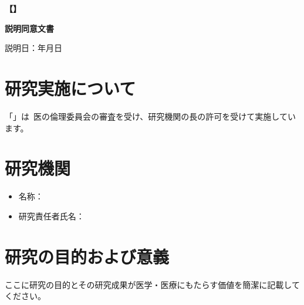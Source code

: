 \documentclass[a4paper,11pt,lualatex,ja=standard]{bxjsarticle}
\begin{document}
\begin{center}
{\LARGE \textbf{【\ResearchTitle】}}

\vspace{1em}

{\Large \textbf{説明同意文書}}

\vspace{2em}

説明日：\hspace{3em}年\hspace{2em}月\hspace{2em}日

\vspace{2em}

{\small \ProtocolVersion\hspace{1em}\ProtocolDate}
\end{center}

\vspace{2em}

\section{研究実施について}

「\ResearchTitle」は\InstitutionFullName\ 医の倫理委員会の審査を受け、研究機関の長の許可を受けて実施しています。

\section{研究機関}

\begin{itemize}
\item 名称：\InstitutionFullName
\item 研究責任者氏名：%
\end{itemize}


\section{研究の目的および意義}

ここに研究の目的とその研究成果が医学・医療にもたらす価値を簡潔に記載してください。
\end{document}
